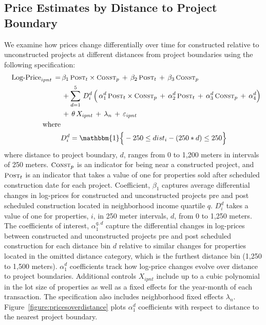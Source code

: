\documentclass[12pt]{article}
\begin{document}
\subsection{Price Estimates by Distance to Project Boundary}\label{section:appendixpricedist}


We examine how prices change differentially over time for constructed relative to unconstructed projects at different distances from project boundaries using the following specification:
\begin{align*}
\quad \text{Log-Price}_{ipnt} \, =&  \, \beta_1 \, \textsc{\small Post}_{t}\times\textsc{\small Const}_{p} \, + \, \beta_2 \, \textsc{\small Post}_{t} \, + \, \beta_3 \, \textsc{\small Const}_{p}\,  \\
 &\, + \sum_{d=1}^5 \,D_i^{d} \, \Big( \, \alpha_1^{d} \, \textsc{\small Post}_{t}\times\textsc{\small Const}_{p} \, + \, \alpha_2^{d} \, \textsc{\small Post}_{t} \, + \, \alpha_3^{d} \, \textsc{\small Const}_{p}\, +\, \alpha_4^{d} \Big) \, \\
&\, + \, \theta \, X_{ipnt} \, + \, \lambda_n \, + \, \varepsilon_{ipnt} \quad  \\
\text{where}& \\
& D_i^{d} = \mathbbm{1} \Big\{  - 250 \leq dist_i -(250*d) \leq  250 \Big\}
\end{align*}
\noindent where distance to project boundary, $d$, ranges from 0 to 1,200 meters in intervals of 250 meters.  $\textsc{\small Const}_{p}$ is an indicator for being near a constructed project, and  $\textsc{\small Post}_{t}$ is an indicator that takes a value of one for properties sold after scheduled construction date for each project.  Coefficient, $\beta_1$ captures average differential changes in log-prices for constructed and unconstructed projects pre and post scheduled construction located in neighborhood income quartile $q$.  $D_i^{d}$ takes a value of one for properties, $i$, in 250 meter intervals, $d$, from 0 to 1,250 meters.  The coefficients of interest, $\alpha_1^{q,d}$ capture the differential changes in log-prices between constructed and unconstructed projects pre and post scheduled construction for each distance bin $d$ relative to similar changes for properties located in the omitted distance category, which is the furthest distance bin (1,250 to 1,500 meters).  $\alpha_1^{d}$ coefficients track how log-price changes evolve over distance to project boundaries.  Additional controls $X_{ipnt}$ include up to a cubic polynomial in the lot size of properties as well as a fixed effects for the year-month of each transaction.  The specification also includes neighborhood fixed effects $\lambda_n$.  Figure~\ref{figure:pricesoverdistance} plots $\alpha_1^{d}$ coefficients with respect to distance to the nearest project boundary.  
\end{document}
